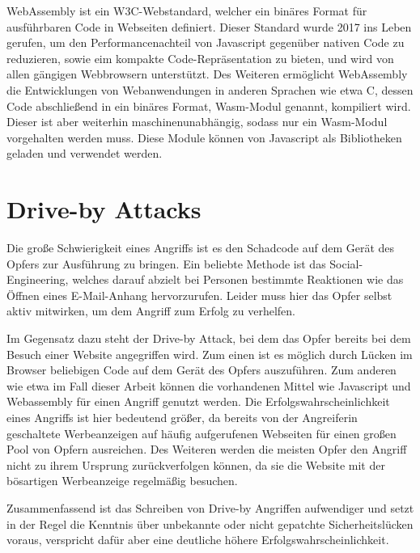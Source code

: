 WebAssembly ist ein W3C-Webstandard, welcher ein binäres Format für ausführbaren Code in Webseiten definiert. 
Dieser Standard wurde 2017 ins Leben gerufen, um den Performancenachteil von Javascript gegenüber nativen Code zu reduzieren, sowie eim kompakte Code-Repräsentation zu bieten, und wird von allen gängigen Webbrowsern unterstützt. 
Des Weiteren ermöglicht WebAssembly die Entwicklungen von Webanwendungen in anderen Sprachen wie etwa C, dessen Code abschließend in ein binäres Format, Wasm-Modul genannt, kompiliert wird.
Dieser ist aber weiterhin maschinenunabhängig, sodass nur ein Wasm-Modul vorgehalten werden muss.
Diese Module können von Javascript als Bibliotheken geladen und verwendet werden.

\section{Drive-by Attacks}

Die große Schwierigkeit eines Angriffs ist es den Schadcode auf dem Gerät des Opfers zur Ausführung zu bringen. Ein beliebte Methode ist das Social-Engineering, welches darauf abzielt bei Personen bestimmte Reaktionen wie das Öffnen eines E-Mail-Anhang hervorzurufen. Leider muss hier das Opfer selbst aktiv mitwirken, um dem Angriff zum Erfolg zu verhelfen.

Im Gegensatz dazu steht der Drive-by Attack, bei dem das Opfer bereits bei dem Besuch einer Website angegriffen wird. Zum einen ist es möglich durch Lücken im Browser beliebigen Code auf dem Gerät des Opfers auszuführen. Zum anderen wie etwa im Fall dieser Arbeit können die vorhandenen Mittel wie Javascript und Webassembly für einen Angriff genutzt werden.
Die Erfolgswahrscheinlichkeit eines Angriffs ist hier bedeutend größer, da bereits von der Angreiferin geschaltete Werbeanzeigen auf häufig aufgerufenen Webseiten für einen großen Pool von Opfern ausreichen.
Des Weiteren werden die meisten Opfer den Angriff nicht zu ihrem Ursprung zurückverfolgen können, da sie die Website mit der bösartigen Werbeanzeige regelmäßig besuchen.

Zusammenfassend ist das Schreiben von Drive-by Angriffen aufwendiger und setzt in der Regel die Kenntnis über unbekannte oder nicht gepatchte Sicherheitslücken voraus, verspricht dafür aber eine deutliche höhere Erfolgswahrscheinlichkeit.



\newtextend